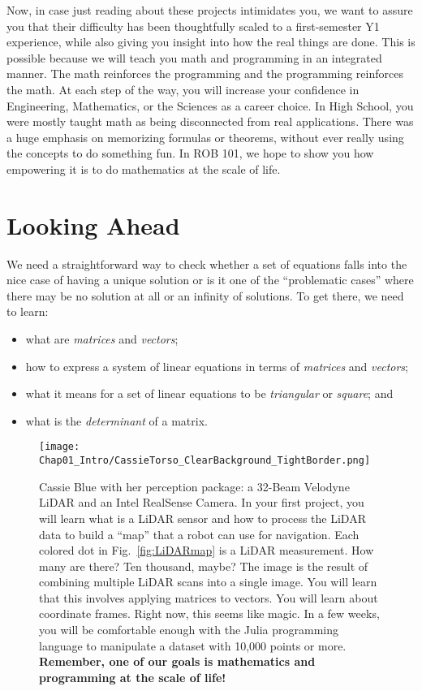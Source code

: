 Now, in case just reading about these projects intimidates you, we want to assure you that their difficulty has been thoughtfully scaled to a first-semester Y1 experience, while also giving you insight into how the real things are done. This is possible because we will teach you math and programming in an integrated manner. The math reinforces the programming and the programming reinforces the math. At each step of the way, you will increase your confidence in Engineering, Mathematics, or the Sciences as a career choice. In High School, you were mostly taught math as being disconnected from real applications. There was a huge emphasis on memorizing formulas or theorems, without ever really using the concepts to do something fun. In ROB 101, we hope to show you how empowering it is to do mathematics at the scale of life.

\section{Looking Ahead}

We need a straightforward way to check whether a set of equations falls into the nice case of having a unique solution or is it one of the ``problematic cases'' where there may be no solution at all or an infinity of solutions. 
To get there, we need to learn:
\begin{itemize}
\item what are \textit{matrices} and \textit{vectors};
    \item how to express a system of linear equations in terms of \textit{matrices} and \textit{vectors};
    \item what it means for a set of linear equations to be \textit{triangular} or \textit{square}; and
    \item what is the \textit{determinant} of a matrix. 
\end{itemize}



 
     \begin{figure}[hbt!]
\centering
\texttt{[image: Chap01\_Intro/CassieTorso\_ClearBackground\_TightBorder.png]}
\caption{Cassie Blue with her perception package: a 32-Beam Velodyne LiDAR and an Intel RealSense Camera. In your first project, you will learn what is a LiDAR sensor and how to process the LiDAR data to build a ``map'' that a robot can use for navigation. Each colored dot in Fig.~\ref{fig:LiDARmap} is a LiDAR measurement. How many are there? Ten thousand, maybe? The image is the result of combining multiple LiDAR scans into a single image. You will learn that this involves applying matrices to vectors. You will learn about coordinate frames. Right now, this seems like magic. In a few weeks, you will be comfortable enough with the Julia programming language to manipulate a dataset with 10,000 points or more. \textbf{Remember, one of our goals is mathematics and programming at the scale of life!} }
\end{figure}




